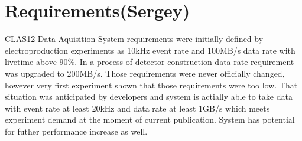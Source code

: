 \section{Requirements(Sergey)}

CLAS12 Data Aquisition System requirements were initially defined by electroproduction experiments as 10kHz event rate and 100MB/s data rate with livetime above 90\%. In a process of detector construction data rate requirement was upgraded to 200MB/s. Those requirements were never officially changed, however very first experiment shown that those requirements were too low. That situation was anticipated by developers and system is actially able to take data with event rate at least 20kHz and data rate at least 1GB/s which meets experiment demand at the moment of current publication. System has potential for futher performance increase as well.

